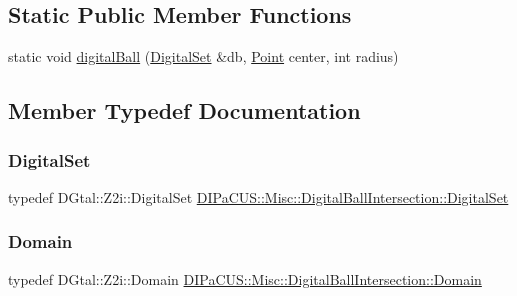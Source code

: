 \subsection*{Static Public Member Functions}
\begin{DoxyCompactItemize}
\item 
static void \hyperlink{classDIPaCUS_1_1Misc_1_1DigitalBallIntersection_afa60d40e425368adaf396d7a1a71242f}{digital\+Ball} (\hyperlink{classDIPaCUS_1_1Misc_1_1DigitalBallIntersection_aaed19d165964a423d69f19a3de0d5587}{Digital\+Set} \&db, \hyperlink{classDIPaCUS_1_1Misc_1_1DigitalBallIntersection_a7e348073cb818df2e225d22746e1d6af}{Point} center, int radius)
\end{DoxyCompactItemize}


\subsection{Member Typedef Documentation}
\mbox{\label{classDIPaCUS_1_1Misc_1_1DigitalBallIntersection_aaed19d165964a423d69f19a3de0d5587}} 
\subsubsection{\texorpdfstring{Digital\+Set}{DigitalSet}}
{\footnotesize\ttfamily typedef D\+Gtal\+::\+Z2i\+::\+Digital\+Set \hyperlink{classDIPaCUS_1_1Misc_1_1DigitalBallIntersection_aaed19d165964a423d69f19a3de0d5587}{D\+I\+Pa\+C\+U\+S\+::\+Misc\+::\+Digital\+Ball\+Intersection\+::\+Digital\+Set}}

\mbox{\label{classDIPaCUS_1_1Misc_1_1DigitalBallIntersection_a23d82ed15613f37ad616a455bcce7542}} 
\subsubsection{\texorpdfstring{Domain}{Domain}}
{\footnotesize\ttfamily typedef D\+Gtal\+::\+Z2i\+::\+Domain \hyperlink{classDIPaCUS_1_1Misc_1_1DigitalBallIntersection_a23d82ed15613f37ad616a455bcce7542}{D\+I\+Pa\+C\+U\+S\+::\+Misc\+::\+Digital\+Ball\+Intersection\+::\+Domain}}

